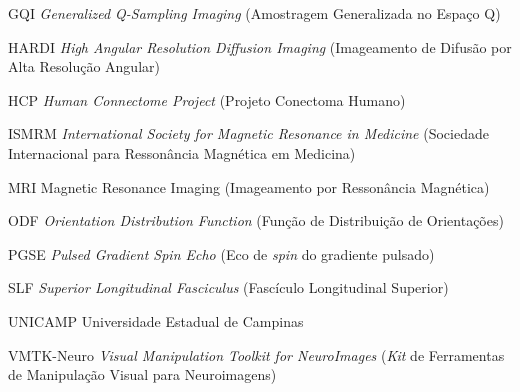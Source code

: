 \documentclass[
    12pt,                %
    oneside,            %
    a4paper,            %
    english,            %
    french,                %
    spanish,            %
    brazil                %
    ]{abntex2}
\begin{document}
\begin{siglas}
\item[GQI] \textit{Generalized Q-Sampling Imaging} (Amostragem Generalizada no Espaço Q)

\item[HARDI] \textit{High Angular Resolution Diffusion Imaging} (Imageamento de Difusão por Alta Resolução Angular)

\item[HCP] \textit{Human Connectome Project} (Projeto Conectoma Humano)

\item[ISMRM]    \textit{International Society for Magnetic Resonance in Medicine} (Sociedade Internacional para Ressonância Magnética em Medicina)

\item[MRI] Magnetic Resonance Imaging (Imageamento por Ressonância Magnética)

\item[ODF] \textit{Orientation Distribution Function} (Função de Distribuição de Orientações)

\item[PGSE] \textit{Pulsed Gradient Spin Echo} (Eco de \textit{spin} do gradiente pulsado)

\item[SLF] \textit{Superior Longitudinal Fasciculus} (Fascículo Longitudinal Superior)



\item[UNICAMP] Universidade Estadual de Campinas

\item[VMTK-Neuro] \textit{Visual Manipulation Toolkit for NeuroImages} (\textit{Kit} de Ferramentas de Manipulação Visual para Neuroimagens)









\end{siglas}





\tableofcontents*
\cleardoublepage
\end{document}
